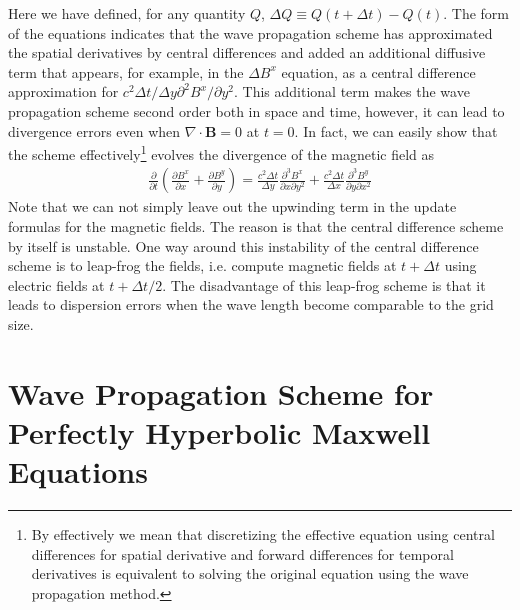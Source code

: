 \documentclass[11pt, reqno]{amsart}
\newcommand{\pfrac}[2]{\frac{\partial #1}{\partial #2}}
\newcommand{\pfraca}[1]{\frac{\partial}{\partial #1}}
\newcommand{\pfracbb}[2]{\partial^2 #1/\partial #2^2}
\newcommand{\mvec}[1]{\mathbf{#1}}
\begin{document}
Here we have defined, for any quantity $Q$, $\Delta Q \equiv
Q(t+\Delta t)-Q(t)$. The form of the equations indicates that the wave
propagation scheme has approximated the spatial derivatives by central
differences and added an additional diffusive term that appears, for
example, in the $\Delta B^x$ equation, as a central difference
approximation for $c^2\Delta t/\Delta y \pfracbb{B^x}{y}$. This
additional term makes the wave propagation scheme second order both in
space and time, however, it can lead to divergence errors even when
$\nabla \cdot \mvec{B} = 0$ at $t=0$. In fact, we can easily show that
the scheme effectively\footnote{By effectively we mean that
  discretizing the effective equation using central differences for
  spatial derivative and forward differences for temporal derivatives
  is equivalent to solving the original equation using the wave
  propagation method.} evolves the divergence of the magnetic field as
\begin{align}
  \pfraca{t}
  \left(
    \pfrac{B^x}{x} + \pfrac{B^y}{y}
  \right)
  =
  \frac{c^2 \Delta t}{\Delta y}
  \frac{\partial^3B^x}{\partial x \partial y^2}
  +
  \frac{c^2 \Delta t}{\Delta x}
  \frac{\partial^3B^y}{\partial y \partial x^2}
\end{align}
Note that we can not simply leave out the upwinding term in the update
formulas for the magnetic fields. The reason is that the central
difference scheme by itself is unstable. One way around this
instability of the central difference scheme is to leap-frog the
fields, i.e. compute magnetic fields at $t+\Delta t$ using electric
fields at $t + \Delta t/2$. The disadvantage of this leap-frog scheme
is that it leads to dispersion errors when the wave length become
comparable to the grid size.

\section{Wave Propagation Scheme for Perfectly Hyperbolic Maxwell
  Equations}
\end{document}
